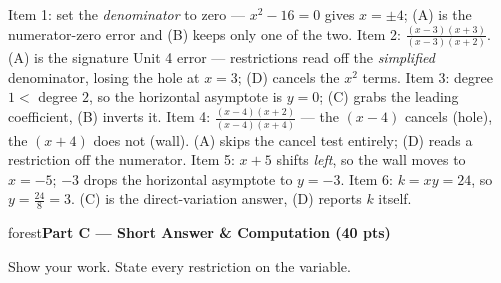\documentclass[10pt]{article}
\newcommand{\parthead}[1]{%
  \vspace{6pt}\noindent
  \begin{headlinebox}{forest}\color{white}\bfseries #1\end{headlinebox}%
  \vspace{4pt}}
\begin{document}
\begin{teachernote}
Item 1: set the \emph{denominator} to zero --- $x^2-16=0$ gives $x=\pm4$; (A) is the numerator-zero
error and (B) keeps only one of the two. Item 2: $\frac{(x-3)(x+3)}{(x-3)(x+2)}$. (A) is the
signature Unit 4 error --- restrictions read off the \emph{simplified} denominator, losing the hole
at $x=3$; (D) cancels the $x^2$ terms. Item 3: degree $1<$ degree $2$, so the horizontal asymptote
is $y=0$; (C) grabs the leading coefficient, (B) inverts it. Item 4:
$\frac{(x-4)(x+2)}{(x-4)(x+4)}$ --- the $(x-4)$ cancels (hole), the $(x+4)$ does not (wall). (A)
skips the cancel test entirely; (D) reads a restriction off the numerator. Item 5: $x+5$ shifts
\emph{left}, so the wall moves to $x=-5$; $-3$ drops the horizontal asymptote to $y=-3$. Item 6:
$k=xy=24$, so $y=\frac{24}{8}=3$. (C) is the direct-variation answer, (D) reports $k$ itself.
\end{teachernote}

\parthead{Part C --- Short Answer \& Computation (40 pts)}
Show your work. State every restriction on the variable.
\end{document}
